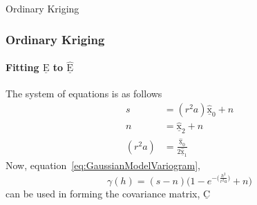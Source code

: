 \documentclass[professionalfont,10pt]{beamer}
\begin{document}
	\begin{frame}[t]{Ordinary Kriging}
		\frametitle{Ordinary Kriging}
		\framesubtitle{Fitting $\underline{\text{E}}$ to $\hat{\underline{\text{E}}}$}
		\hskip-0.75cm
		\begin{minipage}[t]{0.2\linewidth}\vspace{-0.5cm}
			\tiny\tableofcontents[currentsection,currentsubsection,hideothersubsections,subsectionstyle=show/shaded]
		\end{minipage}
		\hfill%
		\begin{minipage}[t]{0.86\linewidth}\vspace{-0.5cm}
			The system of equations is as follows
			\begin{align}
				s &= (r^2a)\hat{\underline{\text{x}}}_0 + n\\
				n &= \hat{\underline{\text{x}}}_2 + n\\
				(r^2a) &= \frac{\hat{\underline{\text{x}}}_0}{2\hat{\underline{\text{x}}}_1}
			\end{align}
			Now, equation~\ref{eq:GaussianModelVariogram},
			\begin{equation*}
			\gamma(h) = (s-n)\bigg(1-e^{-\big(\frac{h^2}{r^2a}\big)} + n\bigg)
			\end{equation*}
			can be used in forming the covariance matrix, $\underline{\text{C}}$
		\end{minipage}
		\vfill%
	\end{frame}
\end{document}
